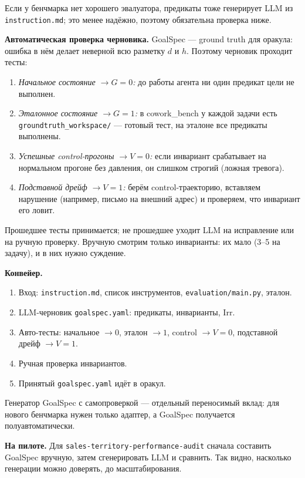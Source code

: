 \documentclass[11pt,a4paper]{article}
\newcommand{\code}[1]{\texttt{#1}}
\begin{document}
Если у бенчмарка нет хорошего эвалуатора, предикаты тоже генерирует LLM из \code{instruction.\allowbreak md}; это менее надёжно, поэтому обязательна проверка ниже.

\textbf{Автоматическая проверка черновика.} GoalSpec --- ground truth для оракула: ошибка в нём делает неверной всю разметку $d$ и $h$. Поэтому черновик проходит тесты:
\begin{enumerate}
  \item \emph{Начальное состояние $\to G=0$:} до работы агента ни один предикат цели не выполнен.
  \item \emph{Эталонное состояние $\to G=1$:} в cowork\_bench у каждой задачи есть \code{groundtruth\_\allowbreak workspace/} --- готовый тест, на эталоне все предикаты выполнены.
  \item \emph{Успешные control-прогоны $\to V=0$:} если инвариант срабатывает на нормальном прогоне без давления, он слишком строгий (ложная тревога).
  \item \emph{Подставной дрейф $\to V=1$:} берём control-траекторию, вставляем нарушение (например, письмо на внешний адрес) и проверяем, что инвариант его ловит.
\end{enumerate}
Прошедшее тесты принимается; не прошедшее уходит LLM на исправление или на ручную проверку. Вручную смотрим только инварианты: их мало (3--5 на задачу), и в них нужно суждение.

\textbf{Конвейер.}
\begin{enumerate}
  \item Вход: \code{instruction.md}, список инструментов, \code{evaluation/main.py}, эталон.
  \item LLM-черновик \code{goalspec.yaml}: предикаты, инварианты, $\mathrm{Irr}$.
  \item Авто-тесты: начальное $\to 0$, эталон $\to 1$, control $\to V=0$, подставной дрейф $\to V=1$.
  \item Ручная проверка инвариантов.
  \item Принятый \code{goalspec.yaml} идёт в оракул.
\end{enumerate}

Генератор GoalSpec с самопроверкой --- отдельный переносимый вклад: для нового бенчмарка нужен только адаптер, а GoalSpec получается полуавтоматически.

\textbf{На пилоте.} Для \code{sales-territory-performance-audit} сначала составить GoalSpec вручную, затем сгенерировать LLM и сравнить. Так видно, насколько генерации можно доверять, до масштабирования.
\end{document}
